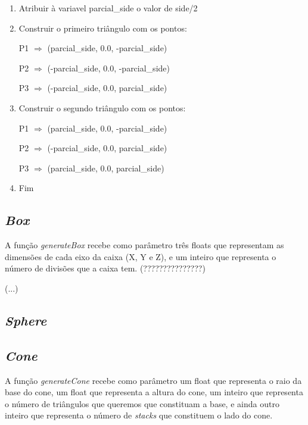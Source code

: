 \documentclass[a4paper]{article}
\begin{document}
\ttfamily
\begin{enumerate}
  \item Atribuir à variavel parcial\_side o valor de side/2
  \item Construir o primeiro triângulo com os pontos:

        \hspace{2cm} P1 $\Rightarrow$ (parcial\_side, 0.0, -parcial\_side)

        \hspace{2cm} P2 $\Rightarrow$ (-parcial\_side, 0.0, -parcial\_side)

        \hspace{2cm} P3 $\Rightarrow$ (-parcial\_side, 0.0, parcial\_side)
  \item Construir o segundo triângulo com os pontos:

        \hspace{2cm} P1 $\Rightarrow$ (parcial\_side, 0.0, -parcial\_side)

        \hspace{2cm} P2 $\Rightarrow$ (-parcial\_side, 0.0, parcial\_side)

        \hspace{2cm} P3 $\Rightarrow$ (parcial\_side, 0.0, parcial\_side)
  \item Fim
\end{enumerate}
\rmfamily


\subsection{\textit{Box}}
\label{sec:box}
A função \textit{generateBox} recebe como parâmetro três floats que representam as dimensões de cada eixo da caixa (X, Y e Z), e um inteiro que representa o número de divisões que a caixa tem. (???????????????)

(...)

\subsection{\textit{Sphere}}
\label{sec:sphere}

\newpage

\subsection{\textit{Cone}}
\label{sec:cone}
A função \textit{generateCone} recebe como parâmetro um float que representa o raio da base do cone, um float que representa a altura do cone, um inteiro que representa o número de triângulos que queremos que constituam a base, e ainda outro inteiro que representa o número de \textit{stacks} que constituem o lado do cone.
\end{document}
